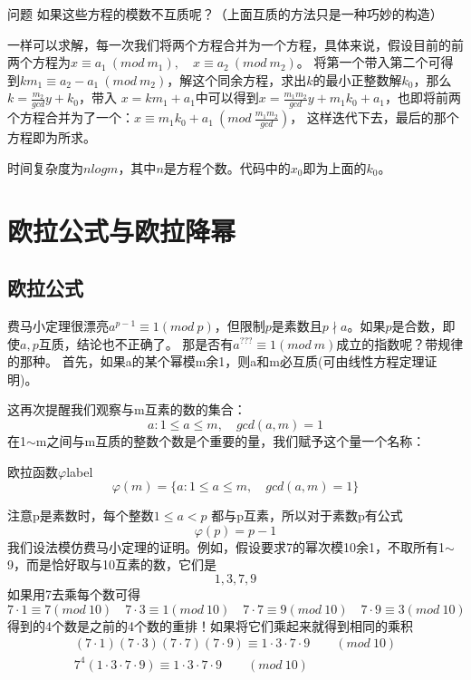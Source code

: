 

\begin{custom}{问题}
	如果这些方程的{\heiti 模数不互质}呢？（上面互质的方法只是一种巧妙的构造）
\end{custom}

一样可以求解，每一次我们将两个方程合并为一个方程，具体来说，假设目前的前两个方程为$x\equiv a_1 \ (mod\ m_1),\quad  x\equiv a_2 \ (mod\ m_2)$。
将第一个带入第二个可得到$km_1\equiv a_2-a_1 \ (mod\ m_2)$，解这个同余方程，求出$k$的最小正整数解$k_0$，那么$k = \frac{m_2}{gcd}y+ k_0$，带入
$x=km_1+a_1$中可以得到$x=\frac{m_1m_2}{gcd}y+m_1k_0+a_1$，也即将前两个方程合并为了一个：$x\equiv m_1k_0+a_1\ (mod\ \frac{m_1m_2}{gcd})$，
这样迭代下去，最后的那个方程即为所求。

时间复杂度为$nlogm$，其中$n$是方程个数。{\heiti 代码中的$x_0$即为上面的$k_0$。}



\section{欧拉公式与欧拉降幂}

\subsection{欧拉公式}

费马小定理很漂亮$a^{p-1}\equiv 1(mod\ p)$，但限制$p$是素数且$p\nmid a$。如果$p$是合数，即使$a,p$互质，结论也不正确了。
那是否有$a^{???}\equiv 1(mod\ m)$成立的指数呢？带规律的那种。
首先，如果a的某个幂模m余1，则a和m必互质(可由线性方程定理证明)。

这再次提醒我们观察与m互素的数的集合：
$$
{a:1\leqslant a\leqslant m,\quad gcd(a,m)=1}
$$
{\heiti 在1$\sim$m之间与m互质的整数个数}是个重要的量，我们赋予这个量一个名称：


\begin{definition}{欧拉函数$\varphi$}{label}
$$
\varphi(m)=\{a:1\leqslant a\leqslant m,\quad gcd(a,m)=1\}
$$
\end{definition}

注意p是素数时，每个整数$1\leqslant a<p$ 都与p互素，所以对于素数p有公式
$$
\varphi(p)=p-1
$$
我们设法模仿费马小定理的证明。例如，假设要求7的幂次模10余1，不取所有1$\sim$9，而是恰好取与10互素的数，它们是
$$
1,3,7,9
$$
如果用7去乘每个数可得
$$
7\cdot 1\equiv 7(mod\ 10)\quad 7\cdot 3\equiv 1(mod\ 10)\quad
7\cdot 7\equiv 9(mod\ 10)\quad 7\cdot9\equiv 3(mod\ 10)
$$
{\heiti 得到的4个数是之前的4个数的重排！}如果将它们乘起来就得到相同的乘积
\begin{align*}
(7\cdot 1)(7\cdot 3)(7\cdot7)(7\cdot9)\equiv 1\cdot3\cdot7\cdot9  \qquad  (mod\ 10)  \\
7^4(1\cdot3\cdot7\cdot9)\equiv 1\cdot3\cdot7\cdot9 \qquad (mod\ 10)
\end{align*}

